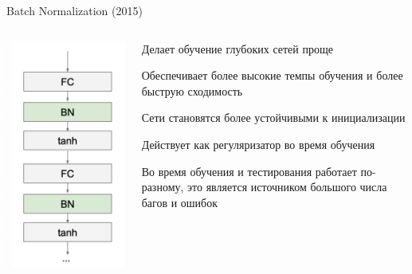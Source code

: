 \documentclass[notes,12pt, aspectratio=169]{beamer}
\newenvironment{wideitemize}{\itemize\addtolength{\itemsep}{10pt}}{\enditemize}
\begin{document}
\begin{frame}{Batch Normalization (2015)}
	\begin{columns}[T] %
		\begin{column}{.3\textwidth}
			\includegraphics[width=.9\linewidth]{batch_norm_in_nn.png}
		\end{column}%
		\hfill%
		\begin{column}{.7\textwidth}
			\begin{wideitemize}
				\item  Делает обучение глубоких сетей проще
				\item Обеспечивает более высокие темпы обучения и более быструю сходимость
				\item Сети становятся более устойчивыми к инициализации
				\item Действует как регуляризатор во время обучения 
				\item \alert{Во время обучения и тестирования работает по-разному, это является источником большого числа багов и ошибок}
			\end{wideitemize}
		\end{column}%
\end{columns}
\end{frame}
\end{document}
